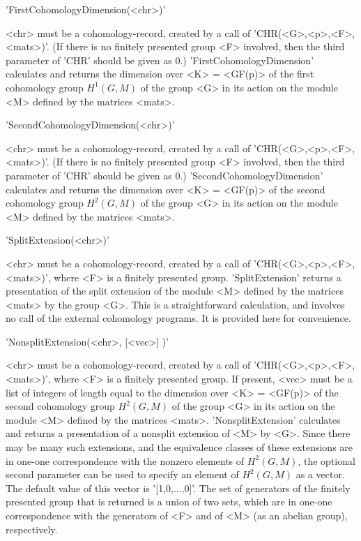 'FirstCohomologyDimension(<chr>)'

<chr> must be a cohomology-record, created by a call of
'CHR(<G>,<p>,<F>,<mats>)'. (If there is no finitely presented group <F> involved,
then the third parameter of 'CHR' should be given as 0.)
'FirstCohomologyDimension' calculates and returns the dimension
over <K> = <GF(p)> of the first cohomology group $H^1(G,M)$ of the group
<G> in its action on the module <M> defined by the matrices <mats>.

'SecondCohomologyDimension(<chr>)'

<chr> must be a cohomology-record, created by a call of
'CHR(<G>,<p>,<F>,<mats>)'.
(If there is no finitely presented group <F> involved,
then the third parameter of 'CHR' should be given as 0.)
'SecondCohomologyDimension' calculates and returns the dimension
over <K> = <GF(p)> of the second cohomology group $H^2(G,M)$ of the group
<G> in its action on the module <M> defined by the matrices <mats>.

'SplitExtension(<chr>)'

<chr> must be a cohomology-record, created by a call of
'CHR(<G>,<p>,<F>,<mats>)', where <F> is a finitely presented group.
'SplitExtension' returns a presentation of the split extension of the module
<M> defined by the matrices <mats> by the group <G>.
This is a straightforward calculation, and involves no call of the
external cohomology programs. It is provided here for convenience.

'NonsplitExtension(<chr>, [<vec>] )'

<chr> must be a cohomology-record, created by a call of
'CHR(<G>,<p>,<F>,<mats>)', where <F> is a finitely presented group.
If present, <vec> must be a list of integers of length equal to the
dimension over <K> = <GF(p)> of the second cohomology group $H^2(G,M)$ of the
group <G> in its action on the module <M> defined by the matrices <mats>.
'NonsplitExtension' calculates and returns a presentation of a nonsplit
extension of <M> by <G>. Since there may be many such extensions, and
the equivalence classes of these extensions are in one-one correspondence
with the nonzero elements of $H^2(G,M)$, the optional second parameter
can be used to specify an element of $H^2(G,M)$ as a vector.
The default value of this vector is '[1,0,...,0]'.
The set of generators of the finitely presented group that is returned
is a union of two sets, which are in one-one correspondence with the
generators of <F> and of <M> (as an abelian group), respectively. 

